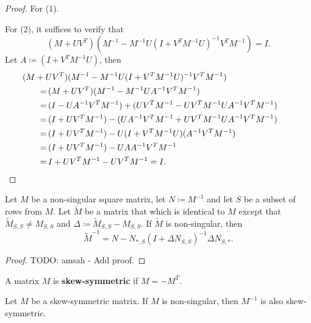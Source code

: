 \begin{proof}
    For (1).

    For (2), it suffices to verify that 
    \[
        (M + UV^T)(M^{-1} - M^{-1}U(I + V^TM^{-1}U)^{-1}V^TM^{-1}) = I.
    \]
    Let \(A \coloneqq (I + V^TM^{-1}U)\), then
    \begin{align*}
        &\!\!\!\!\!\!\!\!\!\!\!\!\!\!\!\!\!\! (M + UV^T)(M^{-1} - M^{-1}U(I + V^TM^{-1}U)^{-1}V^TM^{-1})\\
        = \, &(M + UV^T)(M^{-1} - M^{-1}UA^{-1}V^TM^{-1})\\
        = \, &(I - UA^{-1}V^TM^{-1}) + (UV^TM^{-1} - UV^TM^{-1}UA^{-1}V^TM^{-1}) \\
        = \, &(I + UV^TM^{-1}) - (UA^{-1}V^TM^{-1} + UV^TM^{-1}UA^{-1}V^TM^{-1}) \\
        = \, &(I + UV^TM^{-1}) - U(I + V^TM^{-1}U)(A^{-1}V^TM^{-1}) \\
        = \, &(I + UV^TM^{-1}) - UAA^{-1}V^TM^{-1} \\
        = \, &I + UV^TM^{-1} - UV^TM^{-1} = I. \qedhere \\
    \end{align*}
\end{proof}

\begin{corollary}
    \label{cor:update_cor} 
    Let \(M\) be a non-singular square matrix, let \(N \coloneqq M^{-1}\) and let \(S\) be a subset of rows from \(M\).
    Let \(\tilde{M}\) be a matrix that which is identical to \(M\) except that \(\tilde{M}_{S, S} \neq M_{S, S}\)
    and \(\Delta \coloneqq \tilde{M}_{S, S} - M_{S, S}\).
    If \(\tilde{M}\) is non-singular, then
    \[
        \tilde{M}^{-1} = N - N_{*, S}(I + \Delta N_{S, S})^{-1}\Delta N_{S, *}.
    \]
\end{corollary}

\begin{proof}
    TODO: amsah - Add proof.
\end{proof}

\begin{definition}
\label{def:skew}
    A matrix \(M\) is \textbf{skew-symmetric} if \(M = -M^{T}\).
\end{definition}

\begin{fact}
    Let \(M\) be a skew-symmetric matrix.
    If \(M\) is non-singular, then \(M^{-1}\) is also skew-symmetric.
\end{fact}


